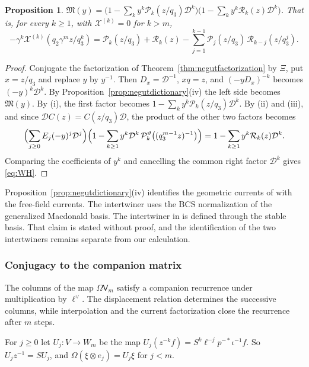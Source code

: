 \documentclass[11pt]{amsart}
\newtheorem{proposition}[theorem]{Proposition}
\theoremstyle{definition}
\theoremstyle{remark}
\newcommand{\Newton}[1]{E_{#1}}                  %
\newcommand{\Wsp}[1]{W_{#1}}                     %
\newcommand{\auxe}[1]{e_{#1}}                    %
\newcommand{\taut}{\ell}                         %
\newcommand{\dtaut}{\taut^{\vee}}                %
\newcommand{\pulm}{p^{-*}}                       %
\newcommand{\Shift}{S}                           %
\newcommand{\Omap}{\Omega}                       %
\newcommand{\Hiso}{\iota}                        %
\newcommand{\DD}{\mathcal D}
\newcommand{\Pser}[1]{\mathcal P_{#1}}           %
\newcommand{\Xk}[1]{\mathcal X^{(#1)}}           %
\newcommand{\VV}{\mathsf V}
\newcommand{\Vconj}[1]{\VV_{#1}}                 %
\newcommand{\Rlast}[1]{\mathcal R_{#1}}          %
\newcommand{\Miuraop}{\mathfrak M}               %
\begin{document}
\begin{proposition}\label{prop:WH}
\(\Miuraop(y)=\bigl(1-\sum_ky^k\Pser{k}(z/q_3)\DD^k\bigr)\bigl(1-\sum_ky^k\Rlast{k}(z)\DD^k\bigr)\). That is,
for every \(k\geq1\), with \(\Xk{k}=0\) for \(k>m\),
\begin{equation}\label{eq:WH}
 -\gamma^k\Xk{k}(q_2\gamma^mz/q_3^k)=\Pser{k}(z/q_3)+\Rlast{k}(z)
 -\sum_{j=1}^{k-1}\Pser{j}(z/q_3)\,\Rlast{k-j}(z/q_3^j).
\end{equation}
\end{proposition}

\begin{proof}
Conjugate the factorization of Theorem~\ref{thm:negutfactorization} by \(\Xi\),
put \(x=z/q_3\) and replace \(y\) by \(y^{-1}\). Then
\(D_x=\DD^{-1}\), \(xq=z\), and \((-yD_x)^{-k}\) becomes \((-y)^k\DD^k\). By
Proposition~\ref{prop:negutdictionary}(iv) the left side becomes \(\Miuraop(y)\). By (i), the first
factor becomes \(1-\sum_ky^k\Pser{k}(z/q_3)\DD^k\). By (ii) and (iii), and since
\(\DD C(z)=C(z/q_3)\DD\), the product of the other two factors becomes
\[
 \Bigl(\sum_{j\geq0}\Newton{j}(-y)^j\DD^j\Bigr)
 \Bigl(1-\sum_{k\geq1}y^k\DD^k\,\Pser{k}^\vartheta\bigl((q_3^{m-1}z)^{-1}\bigr)\Bigr)
 =1-\sum_{k\geq1}y^k\Rlast{k}(z)\DD^k.
\]
Comparing the coefficients of \(y^k\) and cancelling the common right factor
\(\DD^k\) gives \eqref{eq:WH}.
\end{proof}

Proposition~\ref{prop:negutdictionary}(iv) identifies the geometric currents of
\cite{N3} with the free-field currents. The intertwiner uses the BCS normalization
of the generalized Macdonald basis. The intertwiner in \cite[Claim~5.9]{N3} is defined
through the stable basis. That claim is stated without proof, and the
identification of the two intertwiners remains separate from our calculation.

\subsubsection{Conjugacy to the companion matrix}\label{sec:proof}\label{sec:companion}

The columns of the map \(\Omap\Vconj{m}\) satisfy a companion recurrence
under multiplication by \(\dtaut\). The displacement relation determines the
successive columns, while interpolation and the current factorization close
the recurrence after \(m\) steps.

For \(j\geq0\) let \(U_j\colon V\to\Wsp{m}\) be the map
\(U_j(z^{-k}f)=\Shift^k\taut^{-j}\pulm\Hiso^{-1}f\). So \(U_jz^{-1}=\Shift U_j\), and
\(\Omap(\xi\otimes\auxe{j})=U_j\xi\) for \(j<m\).
\end{document}
